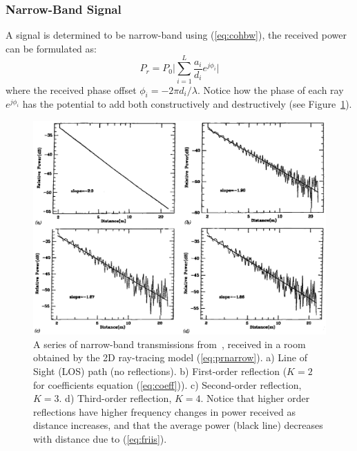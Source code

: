 \subsubsection{Narrow-Band Signal}
A signal is determined to be narrow-band using (\ref{eq:cohbw}), the received power can be formulated as:
\begin{equation}
\label{eq:prnarrow}
P_r = P_0 \Bigg| \sum_{i=1}^L \frac{a_i}{d_i} e^{j\phi_i} \Bigg|
\end{equation}
where the received phase offset $\phi_i=-2\pi d_i/\lambda$. Notice how the phase of each ray $e^{j\phi_i}$ has the potential to add both constructively and destructively (see Figure~\ref{fig:narrowpower}).
\begin{figure}[ht!]
	\centering	\includegraphics[width=1\textwidth,keepaspectratio]{figs/narrowbandpower.png}
    \caption{A series of narrow-band transmissions from~\cite{pahlavan2005wireless}, received in a room obtained by the 2D ray-tracing model (\ref{eq:prnarrow}). a) Line of Sight (LOS) path (no reflections). b) First-order reflection ($K=2$ for coefficients equation (\ref{eq:coeff})). c) Second-order reflection, $K=3$. d) Third-order reflection, $K=4$. Notice that higher order reflections have higher frequency changes in power received as distance increases, and that the average power (black line) decreases with distance due to (\ref{eq:friis}).} 
\label{fig:narrowpower}      
\end{figure}

